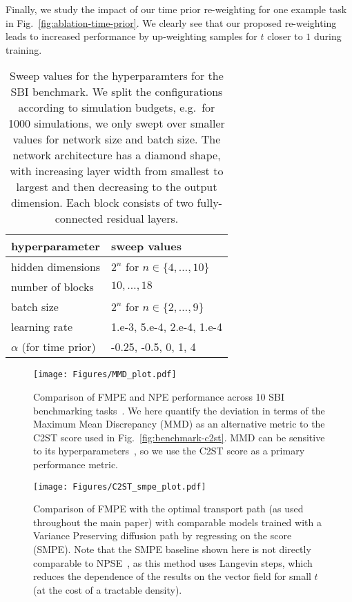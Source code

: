 \documentclass{article}
\theoremstyle{remark}
\begin{document}
Finally,  we study the impact of our time prior re-weighting for one example task in Fig.~\ref{fig:ablation-time-prior}. We clearly see that our proposed re-weighting leads to increased performance by up-weighting samples for $t$ closer to $1$ during training.
\begin{table}
    \centering
    \caption{\label{tab:sbibm-hyperparameters}
        Sweep values for the hyperparamters for the SBI benchmark. We split the configurations according to simulation budgets, e.g.\ for 1000 simulations, we only swept over smaller values for network size and batch size. 
        The network architecture has a diamond shape, with increasing layer width from smallest to largest and then decreasing to the output dimension. Each block consists of two fully-connected residual layers.
    }
    \begin{tabular}{ll}
        \toprule
        hyperparameter & sweep values \\\midrule
        hidden dimensions & $2^n$ for $n \in \{4, \ldots, 10\}$\\
        number of blocks & $ 10, \ldots, 18$\\
        batch size & $2^n$ for $n \in \{2, \ldots, 9\}$\\
        learning rate & 1.e-3, 5.e-4, 2.e-4, 1.e-4\\
        $\alpha$ (for time prior) & -0.25, -0.5, 0, 1, 4 \\
        \bottomrule
    \end{tabular}
\end{table}

\begin{figure}
  \vspace{-5pt}
  \centering
  \texttt{[image: Figures/MMD\_plot.pdf]}
  \vspace{-5pt}
  \caption{\label{fig:benchmark-mmd}
  Comparison of FMPE and NPE performance across 10 SBI benchmarking tasks~\cite{lueckmann2021benchmarking}. We here quantify the deviation in terms of the Maximum Mean Discrepancy (MMD) as an alternative metric to the C2ST score used in Fig.~\ref{fig:benchmark-c2st}. MMD can be sensitive to its hyperparameters~\cite{lueckmann2021benchmarking}, so we use the C2ST score as a primary performance metric.
  }
\end{figure}

\begin{figure}
  \vspace{-5pt}
  \centering
  \texttt{[image: Figures/C2ST\_smpe\_plot.pdf]}
  \vspace{-5pt}
  \caption{\label{fig:benchmark-SMPE}
  Comparison of FMPE with the optimal transport path (as used throughout the main paper) with comparable models trained with a Variance Preserving diffusion path \cite{song2020score} by regressing on the score (SMPE). 
  Note that the SMPE baseline shown here is not directly comparable to NPSE~\cite{sharrock2022sequential,geffner2022score}, as this method uses Langevin steps, which reduces the dependence of the results on the vector field for small $t$ (at the cost of a tractable density).
  }
\end{figure}
\end{document}
